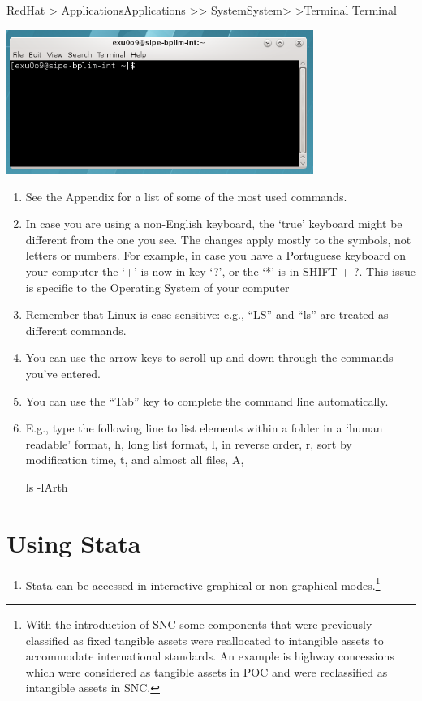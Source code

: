\documentclass[]{book}
\providecommand{\tightlist}{%
  \setlength{\itemsep}{0pt}\setlength{\parskip}{0pt}}
\let\rmarkdownfootnote\footnote%
\def\footnote{\protect\rmarkdownfootnote}
\begin{document}
RedHat \textgreater{} ApplicationsApplications \textgreater{}\textgreater{} SystemSystem\textgreater{} \textgreater{}Terminal
Terminal

\includegraphics[width=3.93701in,height=1.84868in]{./media/image9.png}

\begin{enumerate}
\def\labelenumi{\arabic{enumi}.}
\setcounter{enumi}{1}
\item
  See the Appendix for a list of some of the most used commands.
\item
  In case you are using a non-English keyboard, the `true' keyboard
  might be different from the one you see. The changes apply mostly
  to the symbols, not letters or numbers. For example, in case you
  have a Portuguese keyboard on your computer the `+' is now in key
  `?', or the `*' is in SHIFT + ?. This issue is specific to the
  Operating System of your computer
\item
  Remember that Linux is case-sensitive: e.g., ``LS'' and ``ls'' are
  treated as different commands.
\item
  You can use the arrow keys to scroll up and down through the
  commands you've entered.
\item
  You can use the ``Tab'' key to complete the command line
  automatically.
\item
  E.g., type the following line to list elements within a folder in a
  `human readable' format, h, long list format, l, in reverse order,
  r, sort by modification time, t, and almost all files, A,

  ls -lArth
\end{enumerate}

\hypertarget{using-stata}{%
\section{\texorpdfstring{{Using Stata}}{Using Stata}}\label{using-stata}}

\begin{enumerate}
\def\labelenumi{\arabic{enumi}.}
\tightlist
\item
  Stata can be accessed in interactive graphical or non-graphical
  modes.\footnote{With the introduction of SNC some components that were previously classified as fixed tangible assets were reallocated to intangible assets to accommodate international standards. An example is highway concessions which were considered as tangible assets in POC and were reclassified as intangible assets in SNC.}
\end{enumerate}
\end{document}
